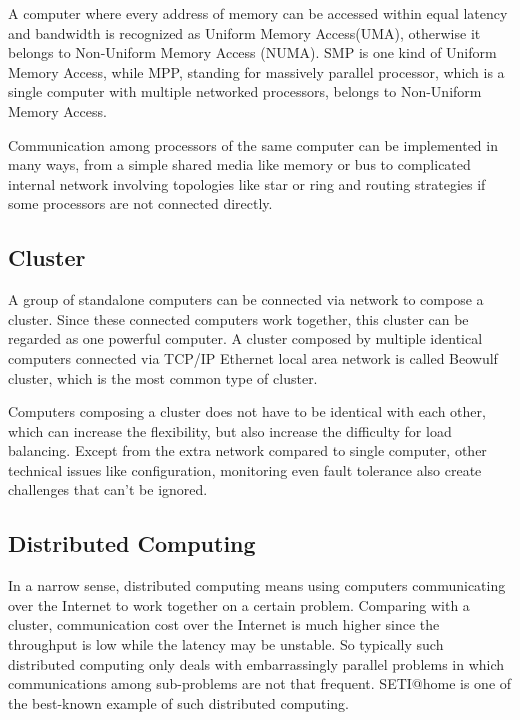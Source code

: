 \documentclass[12pt,a4paper]{report}
\begin{document}
A computer where every address of memory can be accessed within equal latency and bandwidth is recognized as Uniform Memory Access(UMA), otherwise it belongs to Non-Uniform Memory Access (NUMA). SMP is one kind of Uniform Memory Access, while MPP, standing for massively parallel processor, which is a single computer with multiple networked processors, belongs to Non-Uniform Memory Access.

Communication among processors of the same computer can be implemented in many ways, from a simple shared media like memory or bus to complicated internal network involving topologies like star or ring and routing strategies if some processors are not connected directly.

\subsection{Cluster}

A group of standalone computers can be connected via network to compose a cluster. Since these connected computers work together, this cluster can be regarded as one powerful computer. A cluster composed by multiple identical computers connected via TCP/IP Ethernet local area network is called Beowulf cluster, which is the most common type of cluster.

Computers composing a cluster does not have to be identical with each other, which can increase the flexibility, but also increase the difficulty for load balancing. Except from the extra network compared to single computer, other technical issues like configuration, monitoring even fault tolerance also create challenges that can't be ignored.

\subsection{Distributed Computing}

In a narrow sense, distributed computing means using computers communicating over the Internet to work together on a certain problem. Comparing with a cluster, communication cost over the Internet is much higher since the throughput is low while the latency may be unstable. So typically such distributed computing only deals with embarrassingly parallel problems in which communications among sub-problems are not that frequent. SETI@home is one of the best-known example of such distributed computing.
\end{document}
